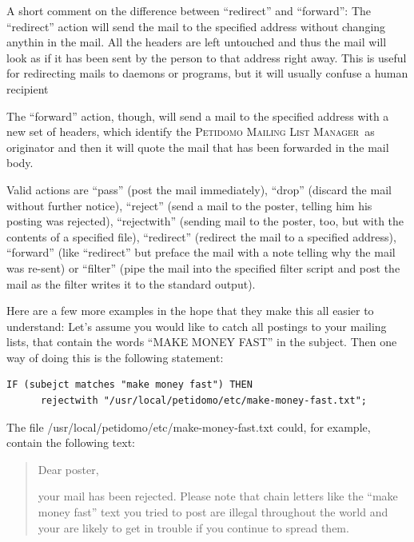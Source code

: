 \documentclass[a4paper,10pt]{scrreprt}
\newcommand{\PetidomoM}{{\scshape Peti\-domo Mail\-ing List Ma\-nager}}
\newcommand{\file}[1]{{\sf #1}}
\begin{document}
A short comment on the difference between ``redirect'' and
``forward'': The ``redirect'' action will send the mail to the
specified address without changing anythin in the mail. All the
headers are left untouched and thus the mail will look as if it has
been sent by the person to that address right away. This is useful for
redirecting mails to daemons or programs, but it will usually confuse
a human recipient

The ``forward'' action, though, will send a mail to the specified
address with a new set of headers, which identify the \PetidomoM\ as
originator and then it will quote the mail that has been forwarded in
the mail body.

Valid actions are ``pass'' (post the mail immediately), ``drop''
(discard the mail without further notice), ``reject'' (send a mail to
the poster, telling him his posting was rejected), ``rejectwith''
(sending mail to the poster, too, but with the contents of a specified
file), ``redirect'' (redirect the mail to a specified address),
``forward'' (like ``redirect'' but preface the mail with a note
telling why the mail was re-sent) or ``filter'' (pipe the mail into
the specified filter script and post the mail as the filter writes it
to the standard output).

Here are a few more examples in the hope that they make this all
easier to understand: Let's assume you would like to catch all
postings to your mailing lists, that contain the words ``MAKE MONEY
FAST'' in the subject. Then one way of doing this is the following
statement:
\begin{verbatim}
IF (subejct matches "make money fast") THEN
      rejectwith "/usr/local/petidomo/etc/make-money-fast.txt";
\end{verbatim}

The file \file{/usr/local/petidomo/etc/make-money-fast.txt} could, for
example, contain the following text:
\begin{quotation}
Dear poster,

your mail has been rejected. Please note that chain letters like the
``make money fast'' text you tried to post are illegal throughout the
world and your are likely to get in trouble if you continue to spread
them.
\end{quotation}
\end{document}
